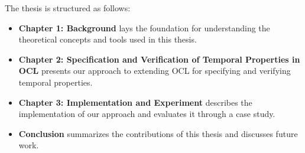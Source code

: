 The thesis is structured as follows:
\begin{itemize}
  \item \textbf{Chapter 1: Background} lays the foundation for understanding the theoretical concepts and tools used in this thesis.
  
  \item \textbf{Chapter 2: Specification and Verification of Temporal Properties in OCL} presents our approach to extending OCL for specifying and verifying temporal properties.

  \item \textbf{Chapter 3: Implementation and Experiment} describes the implementation of our approach and evaluates it through a case study.

  \item \textbf{Conclusion} summarizes the contributions of this thesis and discusses future work.
\end{itemize}
  




